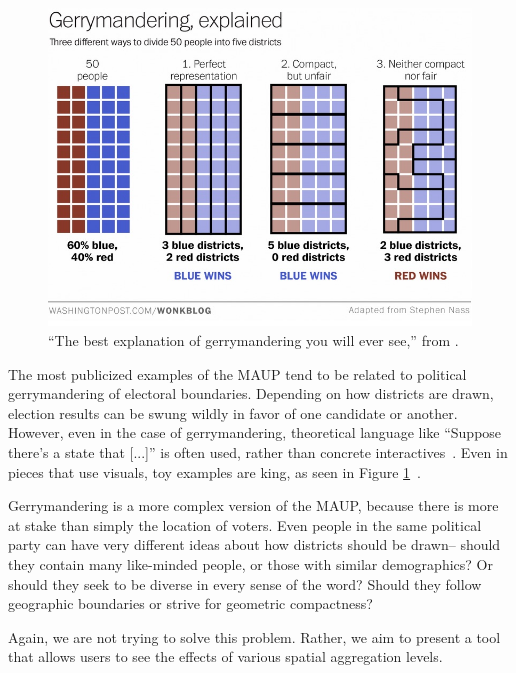 \documentclass{article}\usepackage[]{graphicx}\usepackage[]{color}
\begin{document}
\begin{figure}[htbp]
\begin{centering}
\includegraphics[width=\textwidth]{img/gerrymandering}
\caption{``The best explanation of gerrymandering you will ever see,'' from \cite{Ing2015}.}\label{gerrymandering}
\end{centering}
\end{figure}


The most publicized examples of the MAUP tend to be related to political gerrymandering of electoral boundaries. Depending on how districts are drawn, election results can be swung wildly in favor of one candidate or another. However, even in the case of gerrymandering, theoretical language like ``Suppose there's a state that [...]'' is often used, rather than concrete interactives~\citep{Coh2015}. Even in pieces that use visuals, toy examples are king, as seen in Figure \ref{gerrymandering}~\citep{Ing2015}.


Gerrymandering is a more complex version of the MAUP, because there is more at stake than simply the location of voters. Even people in the same political party can have very different ideas about how districts should be drawn-- should they contain many like-minded people, or those with similar demographics? Or should they seek to be diverse in every sense of the word? Should they follow geographic boundaries or strive for geometric compactness? 

Again, we are not trying to solve this problem. Rather, we aim to present a tool that allows users to see the effects of various spatial aggregation levels.
\end{document}
